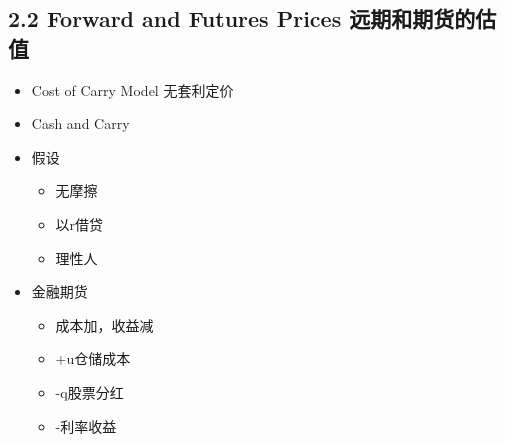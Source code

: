 \documentclass[a4paper,6pt,twoside,openany]{article}
\begin{document}
\subsection*{2.2 Forward and Futures Prices 远期和期货的估值}
\begin{itemize}
\item Cost of Carry Model 无套利定价
\item Cash and Carry
\item 假设
  \begin{itemize}
  \item 无摩擦
  \item 以r借贷
  \item 理性人
  \end{itemize}
\item 金融期货
  \begin{itemize}
  \item 成本加，收益减
  \item +u仓储成本
  \item -q股票分红
  \item -利率收益
  \end{itemize}
\end{itemize}
\end{document}
